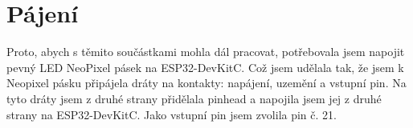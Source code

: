 \section{Pájení}

Proto, abych s těmito součástkami mohla dál pracovat, potřebovala jsem napojit pevný LED NeoPixel pásek na ESP32-DevKitC. Což jsem udělala tak, že jsem k Neopixel pásku připájela dráty na kontakty: napájení, uzemění a vstupní pin. Na tyto dráty jsem z druhé strany přidělala pinhead a napojila jsem jej z druhé strany na ESP32-DevKitC. Jako vstupní pin jsem zvolila pin č. 21.  





